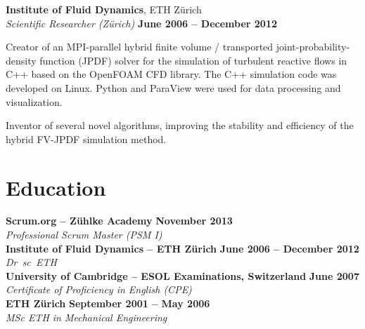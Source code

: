 \documentclass[line,11pt,a4paper]{../resume}
\begin{document}
\begin{resume}
\textbf{Institute of Fluid Dynamics}, ETH Z\"urich\\\vspace{1mm}%
\textsl{Scientific Researcher (Zürich)} \hfill \textbf{June 2006 -- December 2012}\\
\vspace{-4mm}%
\begin{list2}
  \item Creator of an MPI-parallel hybrid finite volume / transported
    joint-probability-density function (JPDF) solver for the simulation of
    turbulent reactive flows in C++ based on the OpenFOAM CFD library. The C++
    simulation code was developed on Linux. Python and ParaView were used for
    data processing and visualization.

  \item Inventor of several novel algorithms, improving the stability and
    efficiency of the hybrid FV-JPDF simulation method.
\end{list2}

\section{\mysidestyle Education}\vspace{2mm}

\textbf{Scrum.org -- Z\"uhlke Academy} \hfill \textbf{November 2013}\\
\vspace{1mm}%
\textsl{Professional Scrum Master (PSM I)}\\
\vspace{-1mm}%
%
\textbf{Institute of Fluid Dynamics -- ETH Z\"urich} \hfill \textbf{June 2006 -- December 2012}\\
\vspace{1mm}%
\textsl{Dr\ sc\ ETH}\\
\vspace{-1mm}%
%
\textbf{University of Cambridge -- ESOL Examinations, Switzerland} \hfill \textbf{June 2007}\\
\vspace{1mm}%
\textsl{Certificate of Proficiency in English (CPE)}\\
\vspace{-1mm}%
%
\textbf{ETH Z\"urich} \hfill \textbf{September 2001 -- May 2006}\\
\vspace{1mm}%
\textsl{MSc ETH in Mechanical Engineering}%
\vspace{-3mm}\\\vspace{-1mm}%


\end{resume}
\end{document}
